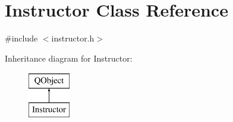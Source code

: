 \hypertarget{class_instructor}{}\section{Instructor Class Reference}
\label{class_instructor}


{\ttfamily \#include $<$instructor.\+h$>$}

Inheritance diagram for Instructor\+:\begin{figure}[H]
\begin{center}
\leavevmode
\includegraphics[height=2.000000cm]{class_instructor}
\end{center}
\end{figure}
